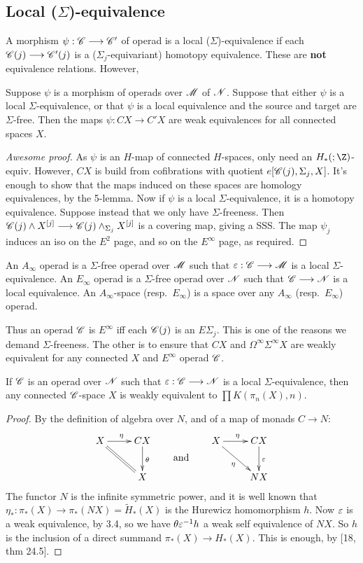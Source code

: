 \documentclass[11pt]{article}
\begin{document}
\subsection{Local (\texorpdfstring{$\Sigma$}{Sigma})-equivalence}
A morphism $\psi:\mathscr{C}\longrightarrow\mathscr{C}'$ of operad is a local ($\Sigma$)-equivalence if
each $\mathscr{C}(j)\longrightarrow\mathscr{C}'(j)$ is a ($\Sigma_j$-equivariant) homotopy equivalence.
These are \textbf{not} equivalence relations. However,
\begin{prop*}
Suppose $\psi$ is a morphism of operads over $\mathscr{M}$ of $\mathscr{N}$. Suppose that
either $\psi$ is a local $\Sigma$-equivalence, or that $\psi$ is a local
equivalence and the source and target are $\Sigma$-free. Then the maps
$\psi:CX\to C'X$ are weak equivalences for all connected spaces $X$.
\end{prop*}
\begin{proof}[Awesome proof]
As $\psi$ is an $H$-map of connected $H$-spaces, only need an $H_*(;\Z)$-equiv.
However, $CX$ is build from cofibrations with quotient $e[\mathscr{C}(j),\Sigma_j,X]$.
It's enough to show that the maps induced on these spaces are homology
equivalences, by the 5-lemma. Now if $\psi$ is a local $\Sigma$-equivalence, 
it is a homotopy equivalence. Suppose instead that we only have $\Sigma$-freeness.
Then $\mathscr{C}(j)\wedge X^{[j]}\longrightarrow\mathscr{C}(j)\wedge_{\Sigma_j} X^{[j]}$ is a covering
map, giving a SSS. The map $\psi_j$ induces an iso on the $E^2$ page, and so
on the $E^\infty$ page, as required.
\end{proof}
\begin{defn*}[3.5]
An $A_\infty$ operad is a $\Sigma$-free operad over $\mathscr{M}$ such that
$\varepsilon:\mathscr{C}\longrightarrow\mathscr{M}$ is a local $\Sigma$-equivalence.
An $E_\infty$ operad is a $\Sigma$-free operad over $\mathscr{N}$ such that 
$\mathscr{C}\longrightarrow\mathscr{N}$ is a local equivalence.
 An $A_\infty$-space 
(resp.\ $E_\infty$) is a space over any $A_\infty$ (resp.\ $E_\infty$) operad.
\end{defn*}\noindent
Thus an operad $\mathscr{C}$ is $E^\infty$ iff each $\mathscr{C}(j)$ is an $E\Sigma_j$. 
This is one of the reasons we demand $\Sigma$-freeness. The other is to ensure
that $CX$ and $\Omega^\infty\Sigma^\infty X$ are weakly equivalent for any
connected $X$ and $E^\infty$ operad $\mathscr{C}$.
\begin{prop*}[3.6]
If $\mathscr{C}$ is an operad over $\mathscr{N}$ such that $\varepsilon:\mathscr{C}\longrightarrow\mathscr{N}$ is a local
$\Sigma$-equivalence, then any connected $\mathscr{C}$-space $X$ is weakly equivalent
to $\prod K(\pi_n(X),n)$.
\end{prop*}
\begin{proof}
By the definition of algebra over $N$, and of a map of monads $C\to N$:
\[\xymatrix{
X\ar[r]^\eta&CX\ar[d]^\theta\\
&X\ar@{=}[ul]
}
\raisebox{-.6cm}{\text{\qquad and\qquad}}
\xymatrix{
X\ar[dr]_{\eta}\ar[r]^\eta&CX\ar[d]^\eps\\
&NX
}\]
The functor $N$ is the infinite symmetric power, and it is well known that
$\eta_*:\pi_*(X)\to\pi_*(NX)=\widetilde H_*(X)$ is the Hurewicz homomorphism $h$.
Now $\varepsilon$ is a weak equivalence, by 3.4, so we have $\theta\varepsilon^{-1}h$ a weak
self equivalence of $NX$. So $h$ is the inclusion of a direct summand
$\pi_*(X)\to H_*(X)$. This is enough, by [18, thm 24.5].
\end{proof}
\end{document}
